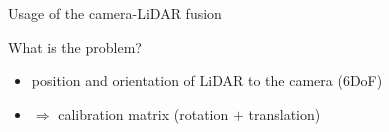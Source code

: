 \documentclass[pdf]{beamer}
\begin{document}
\begin{frame}{Usage of the camera-LiDAR fusion}
\begin{minipage}{0.47\textwidth}
\begin{figure}[h]
		\end{figure}
			\end{minipage} \begin{minipage}{0.5\textwidth}
		\begin{figure}[h]
			\centering
		\end{figure}
			\end{minipage}
			
 		\begin{block}{What is the problem?}
			\begin{itemize}
				\item position and orientation of LiDAR to the camera ($6$DoF)
				\item $\Rightarrow$ calibration matrix (rotation $+$ translation)
			\end{itemize}
 		\end{block}
	\end{frame}
		
\end{document}
